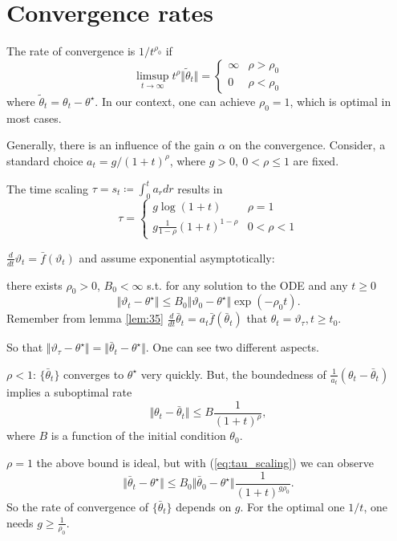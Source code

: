 \section{Convergence rates}

The rate of convergence is \(1/t^{\rho_0}\) if 
\[\limsup_{t\to\infty} t^\rho\Vert \tilde{\theta}_t\Vert = \begin{cases}
    \infty  & \rho>\rho_0\\ 
    0 & \rho<\rho_0
\end{cases}\]
where \(\tilde{\theta}_t=\theta_t-\theta^\star\). In our context, one can achieve \(\rho_0=1\),
which is optimal in most cases.

Generally, there is an influence of the gain \(\alpha\) on the convergence. Consider, a standard 
choice \(a_t=g/(1+t)^\rho\), where \(g>0,\ 0< \rho\leq 1\) are fixed.

The time scaling \(\tau=s_t\coloneqq \int_0^t a_rdr\) results in 
\begin{equation}\label{eq:tau_scaling}\tau=\begin{cases}
    g\log(1+t) & \rho=1\\
    g\frac{1}{1-\rho}(1+t)^{1-\rho} & 0<\rho < 1
\end{cases}\end{equation} 

\(\frac{d}{dt}\vartheta_t=\bar{f}(\vartheta_t)\) and assume exponential asymptotically: 

there exists \(\rho_0>0\), \(B_0<\infty\) s.t. for any solution to the ODE and any \(t\geq 0\)
\[\Vert \vartheta_t-\theta^\star\Vert\leq B_0\Vert \vartheta_0-\theta^\star\Vert \exp(-\rho_0t).\]
Remember from  lemma \ref{lem:35} \(\frac{d}{dt}\bar{\theta}_t=a_t\bar{f}(\bar{\theta}_t)\) that 
\(\theta_t=\vartheta_\tau,t\geq t_0\).

So that \(\Vert \vartheta_\tau-\theta^\star\Vert=\Vert \bar{\theta}_t-\theta^\star\Vert\). One can 
see two different aspects.

\(\rho<1\): \(\{\bar{\theta}_t\}\) converges to \(\theta^\star\) very quickly. But, 
the boundedness of \(\frac{1}{a_t}(\theta_t-\bar{\theta}_t)\) implies a suboptimal rate 
\[\Vert \theta_t-\bar{\theta}_t\Vert\leq B\frac{1}{(1+t)^\rho},\]
where \(B\) is a function of the initial condition \(\theta_0\).

\(\rho=1\) the above bound is ideal, but with (\ref{eq:tau_scaling}) we can observe 
\[\Vert \bar{\theta}_t-\theta^\star\Vert \leq B_0\Vert \bar{\theta}_0-\theta^\star\Vert \frac{1}{(1+t)^{g\rho_0}}.\]
So the rate of convergence of \(\{\bar{\theta}_t\}\) depends on \(g\). For the optimal one \(1/t\), one needs 
\(g\geq \frac{1}{\rho_0}\).

